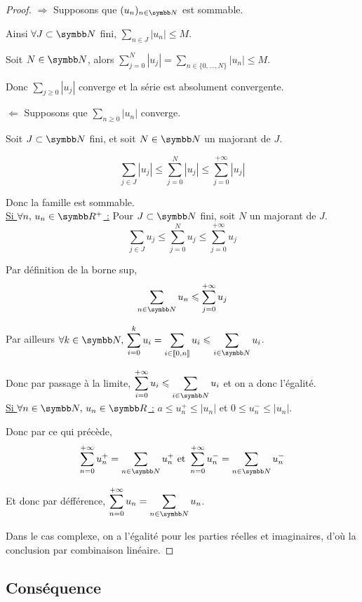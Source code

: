 \begin{proof}
    $\Rightarrow$ Supposons que $(u_n)_{n \in \N}$ est sommable. 

    Ainsi $\forall J \subset \N$ fini, $\displaystyle \sum_{n \in J} |u_n| \leqslant M$.

    Soit $N \in \N$, alors $\displaystyle \sum_{j = 0 }^N |u_j|  = \sum_{n \in \{0, \ldots, N\}} |u_n| \leqslant M$.

    Donc $\sum_{j \geqslant 0} |u_j|$ converge et la série est absolument convergente. 

    \lvspace $\Leftarrow$ Supposons que $\sum_{n \geqslant 0} |u_n|$ converge. 

    Soit $J \subset \N$ fini, et soit $N \in \N$ un majorant de $J$. 

    \[\sum_{j \in J} |u_j| \leqslant \sum_{j = 0}^N |u_j| \leqslant \sum_{j = 0}^{+\infty} |u_j|\]

    Donc la famille est sommable. \\

    \uline{Si $\forall n, \, u_n \in \R^+$ :}
    Pour $J \subset \N$ fini, soit $N$ un majorant de $J$. 
    \[\sum_{j \in J} u_j \leqslant \sum_{j = 0}^N u_j \leqslant \sum_{j = 0}^{+\infty} u_j\]

    Par définition de la borne sup, 
    \[\sum_{n \in \N} u_n \leqslant \sum_{j = 0 }^{+\infty} u_j\]

    Par ailleurs $\forall k \in \N, \, \displaystyle \sum_{i = 0}^k u_i  = \sum_{i \in \ninter 0 n} u_i \leqslant \sum_{i \in \N} u_i$.

    Donc par passage à la limite, $\displaystyle \sum_{i = 0}^{+\infty} u_i \leqslant \sum_{i \in \N} u_i$ et on a donc l'égalité. \\

    \uline{Si $\forall n \in \N, \, u_n \in \R$ :}
    $a \leqslant u_n^+ \leqslant |u_n|$ et $0 \leqslant u_n^- \leqslant |u_n|$.

    Donc par ce qui précède, 
    \[\sum_{n = 0}^{+ \infty} u_n^+ = \sum_{n \in \N} u_n^+ \text{ et } \sum_{n = 0}^{+\infty} u_n^- = \sum_{n \in \N} u_n^-\]

    Et donc par défférence, $\displaystyle \sum_{n = 0}^{+\infty} u_n = \sum_{n \in \N} u_n$.

    Dans le cas complexe, on a l'égalité pour les parties réelles et imaginaires, d'où la conclusion 
    par combinaison linéaire. 
\end{proof}

\subsection{Conséquence}

